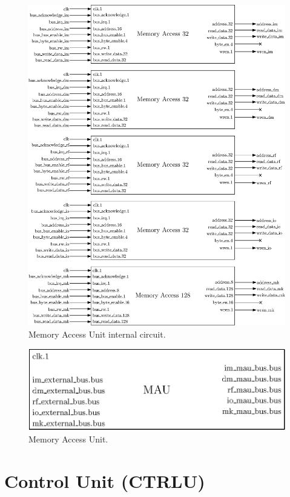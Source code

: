 \begin{figure}[ht!]
    \center
    \includegraphics[width=\linewidth]{"Chapter5-MAU_CTRLU/res/mau_in"}
    \caption{Memory Access Unit internal circuit.}
    \label{fig:mau_in}
\end{figure}

\begin{figure}[ht!]
    \center
    \includegraphics[scale=0.8]{"Chapter5-MAU_CTRLU/res/mau"}
    \caption{Memory Access Unit.}
    \label{fig:mau}
\end{figure}

\section{Control Unit (CTRLU)}

